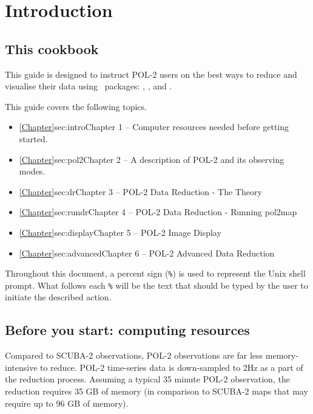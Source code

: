 \chapter{Introduction}
\label{sec:intro}

\renewcommand{\thepage}{\arabic{page}}
\setcounter{page}{1}

\section{This cookbook}

This guide is designed to instruct POL-2 users on the best ways to
reduce and visualise their data using \starlink\ packages: \smurf
\cite{smurf}, \Kappa , \polpack and \gaia.

This guide covers the following topics.
\begin{itemize}
\itemsep0em
\item \cref{Chapter}{sec:intro}{Chapter 1} -- Computer resources needed before getting started.
\item \cref{Chapter}{sec:pol2}{Chapter 2} -- A description of POL-2 and its observing modes.
\item \cref{Chapter}{sec:dr}{Chapter 3} -- POL-2 Data Reduction - The Theory
\item \cref{Chapter}{sec:rundr}{Chapter 4} -- POL-2 Data Reduction - Running pol2map
\item \cref{Chapter}{sec:display}{Chapter 5} -- POL-2 Image Display
\item \cref{Chapter}{sec:advanced}{Chapter 6} -- POL-2 Advanced Data Reduction

\end{itemize}

Throughout this document, a percent sign (\texttt{\%}) is used to
represent the Unix shell prompt. What follows each \texttt{\%} will be
the text that should be typed by the user to initiate the described action.

\section{ Before you start: computing resources}
\label{sec:computing}

Compared to SCUBA-2 observations, POL-2 observations are far less memory-intensive to reduce.
POL-2 time-series data is down-sampled to 2Hz as a part of the reduction process. Assuming a typical 35
minute POL-2 observation, the reduction requires 35 GB of memory (in comparison to SCUBA-2
maps that may require up to 96 GB of memory).

